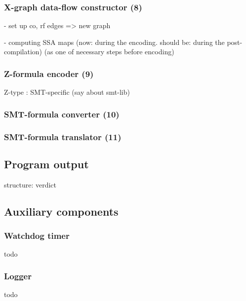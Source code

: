 \subsubsection{X-graph data-flow constructor (8)}
\label{ch:impl:proc:x-df}%

- set up co, rf edges => new graph

- computing SSA maps (now: during the encoding. should be: during the post-compilation) (as one of necessary steps before encoding)


\subsubsection{Z-formula encoder (9)}
\label{ch:impl:proc:z-encoder}

Z-type : SMT-specific (say about smt-lib)


\subsubsection{SMT-formula converter (10)}
\label{ch:impl:proc:smt-converter}%


\subsubsection{SMT-formula translator (11)}
\label{ch:impl:proc:smt-solver}%



\subsection{Program output}
\label{ch:impl:out}

structure: verdict




\subsection{Auxiliary components}
\label{ch:impl:aux}

\subsubsection{Watchdog timer}
\label{ch:impl:aux:watchdog}


todo

\subsubsection{Logger}
\label{ch:impl:aux:logger}


todo






